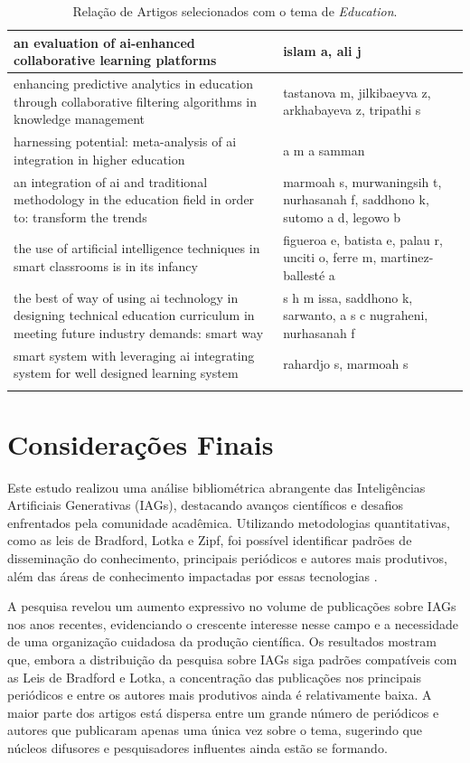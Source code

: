\documentclass[openany,oneside,a4paper,11pt]{extarticle}
\begin{document}
\begin{longtable}{|p{10cm}|p{6cm}|}
    \hline
    an evaluation of ai-enhanced collaborative learning platforms & islam a, ali j \\
    \hline
    enhancing predictive analytics in education through collaborative filtering algorithms in knowledge management & tastanova m, jilkibaeyva z, arkhabayeva z, tripathi s \\
    \hline
    harnessing potential: meta-analysis of ai integration in higher education & a m a samman \\
    \hline
    an integration of ai and traditional methodology in the education field in order to: transform the trends & marmoah s, murwaningsih t, nurhasanah f, saddhono k, sutomo a d, legowo b \\
    \hline
    the use of artificial intelligence techniques in smart classrooms is in its infancy & figueroa e, batista e, palau r, unciti o, ferre m, martinez-ballesté a \\
    \hline
    the best of way of using ai technology in designing technical education curriculum in meeting future industry demands: smart way & s h m issa, saddhono k, sarwanto, a s c nugraheni, nurhasanah f \\
    \hline
    smart system with leveraging ai integrating system for well designed learning system & rahardjo s, marmoah s \\
    \hline
    \caption{Relação de Artigos selecionados com o tema de \textit{Education}.}
    \label{tab:3}
\end{longtable}

\section{Considerações Finais}
 Este estudo realizou uma análise bibliométrica abrangente das Inteligências Artificiais Generativas (IAGs), destacando avanços científicos e desafios enfrentados pela comunidade acadêmica. Utilizando metodologias quantitativas, como as leis de Bradford, Lotka e Zipf, foi possível identificar padrões de disseminação do conhecimento, principais periódicos e autores mais produtivos, além das áreas de conhecimento impactadas por essas tecnologias \cite{guedes2005bibliometria}. 
 
 A pesquisa revelou um aumento expressivo no volume de publicações sobre IAGs nos anos recentes, evidenciando o crescente interesse nesse campo e a necessidade de uma organização cuidadosa da produção científica. Os resultados mostram que, embora a distribuição da pesquisa sobre IAGs siga padrões compatíveis com as Leis de Bradford e Lotka, a concentração das publicações nos principais periódicos e entre os autores mais produtivos ainda é relativamente baixa. A maior parte dos artigos está dispersa entre um grande número de periódicos e autores que publicaram apenas uma única vez sobre o tema, sugerindo que núcleos difusores e pesquisadores influentes ainda estão se formando. 
 
\end{document}
